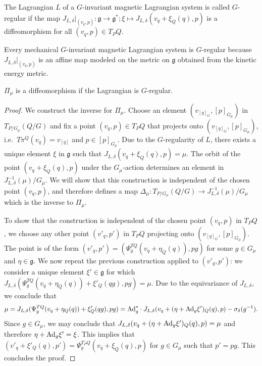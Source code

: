 \documentclass[pdftex]{sigma}
\newcommand{\lag}{\mathfrak{g}}
\begin{document}
\begin{definition} The Lagrangian $L$ of a $G$-invariant magnetic Lagrangian system is called $G$-regular if the map $J_{L,\delta}|_{(v_q,p)}: \lag \to \lag^*; \xi \mapsto J_{L,\delta}(v_q +\xi_Q(q),p) $ is a dif\/feomorphism for all $(v_q,p)\in T_PQ$.
\end{definition}
Every mechanical $G$-invariant magnetic Lagrangian system is $G$-regular because $J_{L,\delta}|_{(v_q,p)}$ is an af\/f\/ine map modeled on the metric on $\lag$ obtained from the kinetic energy metric.

\begin{proposition}\label{prop:gregular} $\Pi_\mu$ is a diffeomorphism if the Lagrangian is $G$-regular.  \end{proposition}
\begin{proof}
We construct the inverse for $\Pi_\mu$. Choose an element $(v_{[q]_G},[p]_{G_\mu})$ in $T_{P/G_\mu}(Q/G)$ and f\/ix a point $(v_q,p)\in T_PQ$ that projects onto $(v_{[q]_G},[p]_{G_\mu})$, i.e.\ $T\pi^Q(v_q)=v_{[q]}$ and $p\in[p]_{G_\mu}$. Due to the $G$-regularity of $L$, there exists a unique element $\xi$ in $\lag$ such that $J_{L,\delta}(v_q +\xi_Q(q),p) = \mu$. The orbit of the point $(v_q+\xi_Q(q),p)$ under the $G_\mu$-action determines an element in $J_{L,\delta}^{-1}(\mu)/G_\mu$. We will show that this construction is independent of the chosen point $(v_q,p)$, and therefore def\/ines a map $\Delta_\mu: T_{P/G_\mu} (Q/G)\to J^{-1}_{L,\delta}(\mu)/G_\mu$ which is the inverse to $\Pi_\mu$.

To show that the construction is independent of the chosen point $(v_q,p)$ in $T_PQ$, we choose any other point $(v'_q,p')$ in $T_PQ$ projecting onto $(v_{[q]_G},[p]_{G_\mu})$. The point is of the form $(v'_q,p')=(\Psi^{TQ}_g(v_q+\eta_Q(q)),pg)$ for some $g\in G_\mu$ and $\eta\in\lag$. We now repeat the previous  construction applied to $(v'_q,p')$: we consider a unique element $\xi'\in\lag$ for which $J_{L,\delta}(\Psi^{TQ}_g(v_q+\eta_Q(q)) +\xi'_Q(qg),pg) = \mu$. Due to the equivariance of $J_{L,\delta}$, we conclude that
\begin{gather*}
\mu = J_{L,\delta}(\Psi^{TQ}_g(v_q+\eta_Q(q)) +\xi'_Q(qg),pg) ={\rm Ad}_g^*\cdot J_{L,\delta}(v_q+(\eta+{\rm Ad}_g\xi')_Q(q),p) -\sigma_\delta(g^{-1}).
 \end{gather*}
 Since $g\in G_\mu$, we may conclude that $J_{L,\delta}(v_q+(\eta+{\rm Ad}_g\xi')_Q(q),p)=\mu$ and therefore $\eta+{\rm Ad}_g\xi' = \xi$. This implies that $(v'_q+\xi'_Q(q),p')=\Psi^{T_PQ}_g(v_q+\xi_Q(q),p)$ for $g\in G_\mu$ such that $p'=pg$. This concludes the proof.
\end{proof}
\end{document}
